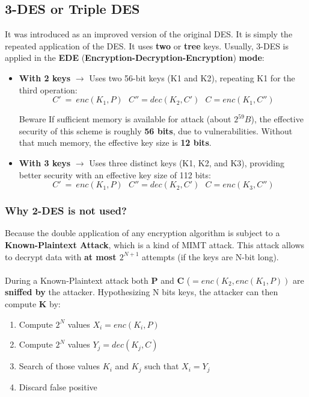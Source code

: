 \subsection{3-DES or Triple DES}
It was introduced as an improved version of the original DES. It is simply the repeated application of the DES. It uses \textbf{two} or \textbf{tree} keys. Usually, 3-DES is applied in the \textbf{EDE} (\textbf{Encryption-Decryption-Encryption}) \textbf{mode}:
\begin{itemize}
    \item \textbf{With 2 keys} \(\rightarrow \) Uses two 56-bit keys (K1 and K2), repeating K1 for the
    third operation:
    \[C'\ =\ enc(K_1,P)\ \ \ C''=dec(K_2,C')\ \ \ C=enc(K_1,C'')\]
    \begin{quotebox-red}{Beware}
        If sufficient memory is available for attack (about \(2^{59} B\)), the effective security
        of this scheme is roughly \textbf{56 bits}, due to vulnerabilities. Without that much
        memory, the effective key size is \textbf{12 bits}.
    \end{quotebox-red}
    \item \textbf{With 3 keys} \(\rightarrow \) Uses three distinct keys (K1, K2, and K3), providing better security with an effective key size of 112 bits:
    \[C'\ =\ enc(K_1,P)\ \ \ C''=dec(K_2,C')\ \ \ C=enc(K_3,C'')\]
\end{itemize}
\begin{customquote}
\vspace{-0.4cm}
\subsubsection{Why 2-DES is not used?}
Because the double application of any encryption algorithm is subject to a \textbf{Known-Plaintext Attack}, which is a kind of MIMT attack. This attack allows to decrypt data with \textbf{at most \(2^{N+1}\)} attempts (if the keys are N-bit long).
\\
\\
During a Known-Plaintext attack both \textbf{P} and \textbf{C} (\(=enc(K_2,enc(K_1,P))\) are \textbf{sniffed by} the attacker. Hypothesizing N bits keys, the attacker can then compute \textbf{K} by:
\begin{enumerate}
    \item Compute \(2^N\) values \(X_i=enc(K_i,P)\)
    \item Compute \(2^N\) values \(Y_j=dec(K_j,C)\)
    \item Search of those values \(K_i\) and \(K_j\) such that \(X_i=Y_j\)
    \item Discard false positive
\end{enumerate}
\end{customquote}


